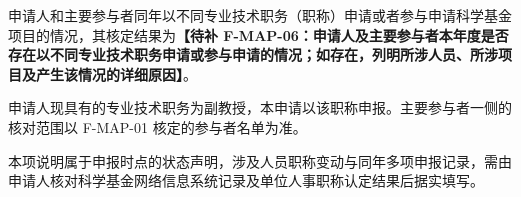 \justifying
\NSFCBodyText

申请人和主要参与者同年以不同专业技术职务（职称）申请或者参与申请科学基金项目的情况，其核定结果为\textbf{【待补 F-MAP-06：申请人及主要参与者本年度是否存在以不同专业技术职务申请或参与申请的情况；如存在，列明所涉人员、所涉项目及产生该情况的详细原因】}。

申请人现具有的专业技术职务为副教授，本申请以该职称申报。主要参与者一侧的核对范围以 F-MAP-01 核定的参与者名单为准。

本项说明属于申报时点的状态声明，涉及人员职称变动与同年多项申报记录，需由申请人核对科学基金网络信息系统记录及单位人事职称认定结果后据实填写。
